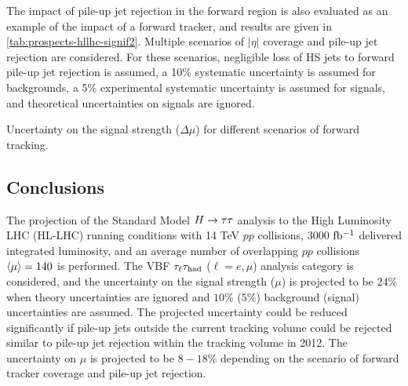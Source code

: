 The impact of pile-up jet rejection in the forward region is also evaluated as an example of the impact of a forward tracker, and results are given in \cref{tab:prospects-hllhc-signif2}. Multiple scenarios of $|\eta|$ coverage and pile-up jet rejection are considered. For these scenarios, negligible loss of HS jets to forward pile-up jet rejection is assumed, a 10\% systematic uncertainty is assumed for backgrounds, a 5\% experimental systematic uncertainty is assumed for signals, and theoretical uncertainties on signals are ignored.

\begin{table}[!htpb]
  \centering
  \renewcommand{\arraystretch}{1.4}
  \caption{Uncertainty on the signal strength ($\Delta\mu$) for different scenarios of forward tracking.}
  
  \label{tab:prospects-hllhc-signif2}
\end{table}

\subsection{Conclusions}

The projection of the Standard Model $H\rightarrow\tau\tau$ analysis to the High Luminosity LHC (HL-LHC) running conditions with 14 TeV $pp$ collisions, 3000 $\mbox{fb$^{-1}$}$ delivered integrated luminosity, and an average number of overlapping $pp$ collisions $\langle\mu\rangle = 140$ is performed. The VBF $\tau_\ell\tau_\text{had}$ ($\ell = e,\mu$) analysis category is considered, and the uncertainty on the signal strength ($\mu$) is projected to be $24\%$ when theory uncertainties are ignored and $10\%$ ($5\%$) background (signal) uncertainties are assumed. The projected uncertainty could be reduced significantly if pile-up jets outside the current tracking volume could be rejected similar to pile-up jet rejection within the tracking volume in 2012. The uncertainty on $\mu$ is projected to be $8-18\%$ depending on the scenario of forward tracker coverage and pile-up jet rejection.

